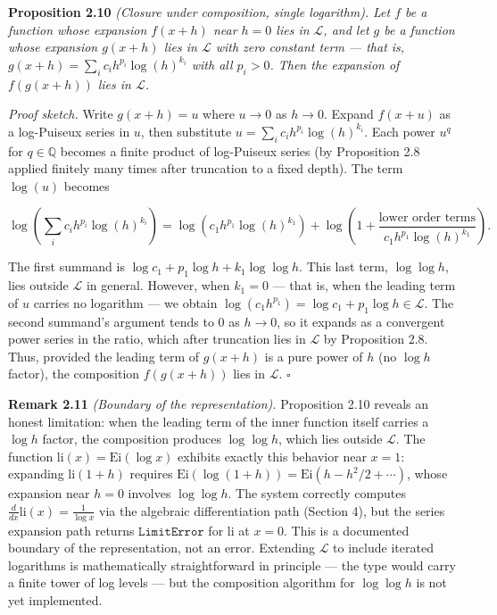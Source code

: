 \documentclass[12pt]{article}
\begin{document}
\textbf{Proposition 2.10} \emph{(Closure under composition, single
logarithm).} \emph{Let \(f\) be a function whose expansion \(f(x + h)\)
near \(h = 0\) lies in \(\mathcal{L}\), and let \(g\) be a function
whose expansion \(g(x + h)\) lies in \(\mathcal{L}\) with zero constant
term --- that is, \(g(x + h) = \sum_i c_i h^{p_i} \log(h)^{k_i}\) with
all \(p_i > 0\). Then the expansion of \(f(g(x+h))\) lies in
\(\mathcal{L}\).}

\emph{Proof sketch.} Write \(g(x+h) = u\) where \(u \to 0\) as
\(h \to 0\). Expand \(f(x + u)\) as a log-Puiseux series in \(u\), then
substitute \(u = \sum_i c_i h^{p_i} \log(h)^{k_i}\). Each power \(u^q\)
for \(q \in \mathbb{Q}\) becomes a finite product of log-Puiseux series
(by Proposition 2.8 applied finitely many times after truncation to a
fixed depth). The term \(\log(u)\) becomes

\[\log\!\left(\sum_i c_i h^{p_i} \log(h)^{k_i}\right) = \log(c_1 h^{p_1} \log(h)^{k_1}) + \log\!\left(1 + \frac{\text{lower order terms}}{c_1 h^{p_1} \log(h)^{k_1}}\right).\]

The first summand is \(\log c_1 + p_1 \log h + k_1 \log \log h\). This
last term, \(\log \log h\), lies outside \(\mathcal{L}\) in general.
However, when \(k_1 = 0\) --- that is, when the leading term of \(u\)
carries no logarithm --- we obtain
\(\log(c_1 h^{p_1}) = \log c_1 + p_1 \log h \in \mathcal{L}\). The
second summand's argument tends to \(0\) as \(h \to 0\), so it expands
as a convergent power series in the ratio, which after truncation lies
in \(\mathcal{L}\) by Proposition 2.8. Thus, provided the leading term
of \(g(x+h)\) is a pure power of \(h\) (no \(\log h\) factor), the
composition \(f(g(x+h))\) lies in \(\mathcal{L}\). \(\square\)

\textbf{Remark 2.11} \emph{(Boundary of the representation).}
Proposition 2.10 reveals an honest limitation: when the leading term of
the inner function itself carries a \(\log h\) factor, the composition
produces \(\log \log h\), which lies outside \(\mathcal{L}\). The
function \(\mathrm{li}(x) = \mathrm{Ei}(\log x)\) exhibits exactly this
behavior near \(x = 1\): expanding \(\mathrm{li}(1 + h)\) requires
\(\mathrm{Ei}(\log(1+h)) = \mathrm{Ei}(h - h^2/2 + \cdots)\), whose
expansion near \(h = 0\) involves \(\log \log h\). The system correctly
computes \(\frac{d}{dx}\mathrm{li}(x) = \frac{1}{\log x}\) via the
algebraic differentiation path (Section 4), but the series expansion
path returns \(\mathtt{LimitError}\) for \(\mathrm{li}\) at \(x = 0\).
This is a documented boundary of the representation, not an error.
Extending \(\mathcal{L}\) to include iterated logarithms is
mathematically straightforward in principle --- the type would carry a
finite tower of log levels --- but the composition algorithm for
\(\log \log h\) is not yet implemented.
\end{document}
